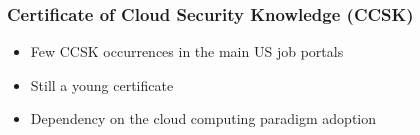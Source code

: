 \documentclass{beamer}
\begin{document}

\begin{frame}
 \frametitle{Certificate of Cloud Security Knowledge (CCSK)}
 \begin{itemize}
 \item Few CCSK occurrences in the main US job portals
 \item Still a young certificate
 \item Dependency on the cloud computing paradigm adoption
 \end{itemize}
\end{frame}
\end{document}
